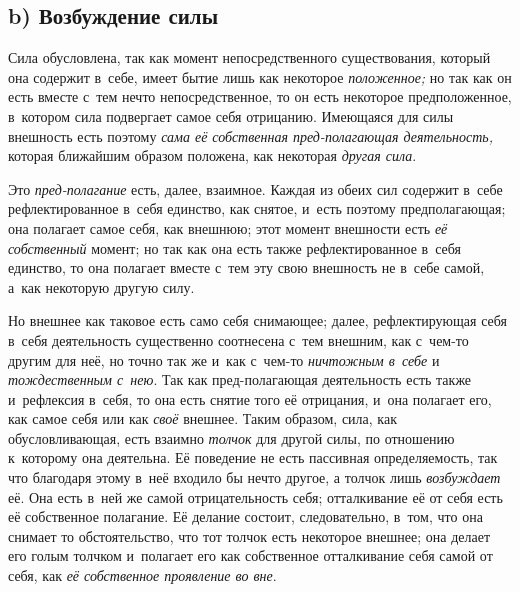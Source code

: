 \subsection[b) Возбуждение силы]{b) Возбуждение силы}

Сила обусловлена, так как момент непосредственного существования, который она
содержит в~себе, имеет бытие лишь как некоторое {\em положенное;} но так как он
есть вместе с~тем нечто непосредственное, то он есть некоторое предположенное,
в~котором сила подвергает самое себя отрицанию. Имеющаяся для силы внешность
есть поэтому {\em сама её собственная пред-полагающая деятельность,}
которая ближайшим образом положена, как некоторая {\em другая сила}.

Это {\em пред-полагание} есть, далее, взаимное. Каждая
из обеих сил содержит в~себе рефлектированное в~себя единство, как снятое,
и~есть поэтому предполагающая; она полагает самое себя, как внешнюю; этот
момент внешности есть {\em её собственный} момент; но
так как она есть также рефлектированное в~себя единство, то она полагает
вместе с~тем эту свою внешность не в~себе самой, а~как некоторую другую силу.

Но внешнее как таковое есть само себя снимающее; далее, рефлектирующая себя
в~себя деятельность существенно соотнесена с~тем внешним, как с~чем-то
другим для неё, но точно так же и~как с~чем-то {\em ничтожным в~себе} и
{\em тождественным с~нею}. Так как пред-полагающая
деятельность есть также и~рефлексия в~себя, то она есть снятие того её
отрицания, и~она полагает его, как самое себя или как
{\em своё} внешнее. Таким образом, сила, как
обусловливающая, есть взаимно {\em толчок} для другой
силы, по отношению к~которому она деятельна. Её поведение не есть пассивная
определяемость, так что благодаря этому в~неё входило бы нечто другое, а
толчок лишь {\em возбуждает} её. Она есть в~ней же
самой отрицательность себя; отталкивание её от себя есть её собственное
полагание. Её делание состоит, следовательно, в~том, что она снимает то
обстоятельство, что тот толчок есть некоторое внешнее; она делает его голым
толчком и~полагает его как собственное отталкивание себя самой от себя, как
{\em её собственное проявление во вне}.

